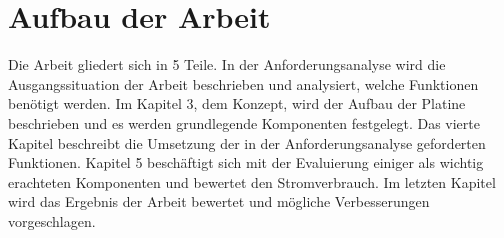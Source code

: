 


\section{Aufbau der Arbeit}
Die Arbeit gliedert sich in 5 Teile. 
In der Anforderungsanalyse wird die Ausgangssituation der Arbeit beschrieben und
analysiert, welche Funktionen benötigt werden. Im Kapitel 3, dem Konzept,
wird der Aufbau der Platine beschrieben und es werden grundlegende Komponenten
festgelegt. Das vierte Kapitel beschreibt die Umsetzung der in der Anforderungsanalyse
geforderten Funktionen. Kapitel 5 beschäftigt sich mit der Evaluierung einiger
als wichtig erachteten Komponenten und bewertet den Stromverbrauch.
Im letzten Kapitel wird das Ergebnis der Arbeit bewertet und mögliche Verbesserungen
vorgeschlagen.



